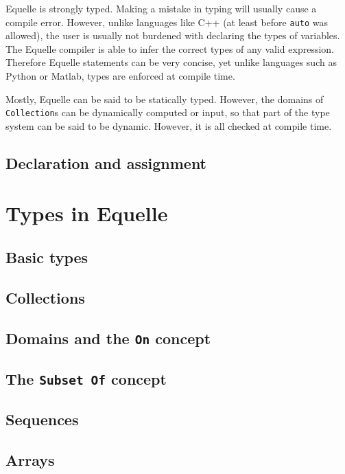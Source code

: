 \documentclass[11pt]{article}
\newcommand{\code}[1]{\texttt{#1}}
\begin{document}
Equelle is strongly typed. Making a mistake in typing will usually cause a compile
error. However, unlike languages like C++ (at least before \code{auto} was allowed), the
user is usually not burdened with declaring the types of variables. The Equelle compiler
is able to infer the correct types of any valid expression. Therefore Equelle statements
can be very concise, yet unlike languages such as Python or Matlab, types are enforced at
compile time.

Mostly, Equelle can be said to be statically typed. However, the domains of
\code{Collection}s can be dynamically computed or input, so that part of the type system
can be said to be dynamic. However, it is all checked at compile time.

\subsection{Declaration and assignment}


\section{Types in Equelle}

\subsection{Basic types}

\subsection{Collections}

\subsection{Domains and the \code{On} concept}

\subsection{The \code{Subset Of} concept}

\subsection{Sequences}

\subsection{Arrays}
\end{document}
